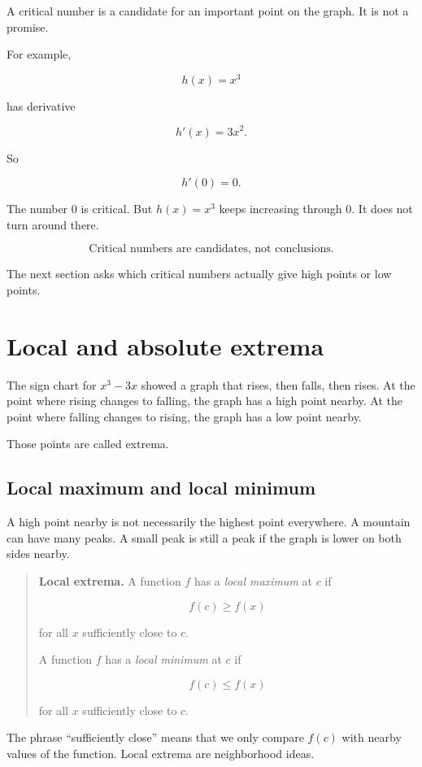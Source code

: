 A critical number is a candidate for an important point on the graph.  It is not a
promise.

For example,

\[
h(x)=x^3
\]

has derivative

\[
h'(x)=3x^2.
\]

So

\[
h'(0)=0.
\]

The number \(0\) is critical.  But \(h(x)=x^3\) keeps increasing through \(0\).  It
does not turn around there.

\[
\boxed{
\text{Critical numbers are candidates, not conclusions.}
}
\]

The next section asks which critical numbers actually give high points or low points.

\section{Local and absolute extrema}
\label{sec:local-absolute-extrema}

The sign chart for \(x^3-3x\) showed a graph that rises, then falls, then rises.
At the point where rising changes to falling, the graph has a high point nearby.
At the point where falling changes to rising, the graph has a low point nearby.

Those points are called extrema.

\subsection{Local maximum and local minimum}
\label{subsec:local-max-local-min}

A high point nearby is not necessarily the highest point everywhere.  A mountain
can have many peaks.  A small peak is still a peak if the graph is lower on both
sides nearby.

\begin{quote}
\textbf{Local extrema.}
A function \(f\) has a \emph{local maximum} at \(c\) if

\[
f(c)\ge f(x)
\]

for all \(x\) sufficiently close to \(c\).

A function \(f\) has a \emph{local minimum} at \(c\) if

\[
f(c)\le f(x)
\]

for all \(x\) sufficiently close to \(c\).
\end{quote}

The phrase ``sufficiently close'' means that we only compare \(f(c)\) with nearby
values of the function.  Local extrema are neighborhood ideas.

